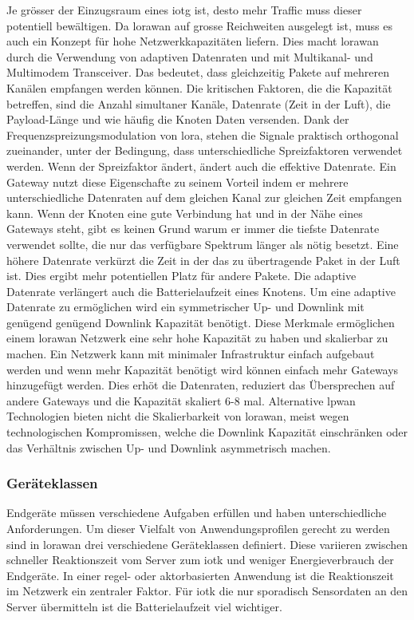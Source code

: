 Je grösser der Einzugsraum eines \gls{iotg} ist, desto mehr Traffic muss dieser potentiell bewältigen. Da \gls{lorawan} auf grosse Reichweiten ausgelegt ist, muss es auch ein Konzept für hohe Netzwerkkapazitäten liefern. Dies macht \gls{lorawan} durch die Verwendung von adaptiven Datenraten und mit Multikanal- und Multimodem Transceiver. Das bedeutet, dass gleichzeitig Pakete auf mehreren Kanälen empfangen werden können. Die kritischen Faktoren, die die Kapazität betreffen, sind die Anzahl simultaner Kanäle, Datenrate (Zeit in der Luft), die Payload-Länge und wie häufig die Knoten Daten versenden. Dank der Frequenzspreizungsmodulation von \gls{lora}, stehen die Signale praktisch orthogonal zueinander, unter der Bedingung, dass unterschiedliche Spreizfaktoren verwendet werden. Wenn der Spreizfaktor ändert, ändert auch die effektive Datenrate. Ein Gateway nutzt diese Eigenschafte zu seinem Vorteil indem er mehrere unterschiedliche Datenraten auf dem gleichen Kanal zur gleichen Zeit empfangen kann. Wenn der Knoten eine gute Verbindung hat und in der Nähe eines Gateways steht, gibt es keinen Grund warum er immer die tiefste Datenrate verwendet sollte, die nur das verfügbare Spektrum länger als nötig besetzt. Eine höhere Datenrate verkürzt die Zeit in der das zu übertragende Paket in der Luft ist. Dies ergibt mehr potentiellen Platz für andere Pakete. Die adaptive Datenrate verlängert auch die Batterielaufzeit eines Knotens. Um eine adaptive Datenrate zu ermöglichen wird ein symmetrischer Up- und Downlink mit genügend genügend Downlink Kapazität benötigt. Diese Merkmale ermöglichen einem \gls{lorawan} Netzwerk eine sehr hohe Kapazität zu haben und skalierbar zu machen. Ein Netzwerk kann mit minimaler Infrastruktur einfach aufgebaut werden und wenn mehr Kapazität benötigt wird können einfach mehr Gateways hinzugefügt werden. Dies erhöt die Datenraten, reduziert das Übersprechen auf andere Gateways und die Kapazität skaliert 6-8 mal. Alternative \gls{lpwan} Technologien bieten nicht die Skalierbarkeit von \gls{lorawan}, meist wegen technologischen Kompromissen, welche die Downlink Kapazität einschränken oder das Verhältnis zwischen Up- und Downlink asymmetrisch machen.

\subsubsection*{Geräteklassen}

Endgeräte müssen verschiedene Aufgaben erfüllen und haben unterschiedliche Anforderungen. Um dieser Vielfalt von Anwendungsprofilen gerecht zu werden sind in \gls{lorawan} drei verschiedene Geräteklassen definiert. Diese variieren zwischen schneller Reaktionszeit vom Server zum \gls{iotk} und weniger Energieverbrauch der Endgeräte. In einer regel- oder aktorbasierten Anwendung ist die Reaktionszeit im Netzwerk ein zentraler Faktor. Für \gls{iotk} die nur sporadisch Sensordaten an den Server übermitteln ist die Batterielaufzeit viel wichtiger.

